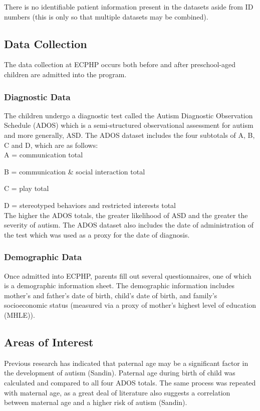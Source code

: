 \documentclass{article}
\begin{document}
There is no identifiable patient information present in the datasets aside from ID numbers (this is only so that multiple datasets may be combined).

\subsection{Data Collection}

The data collection at ECPHP occurs both before and after preschool-aged children are admitted into the program. 

\subsubsection{Diagnostic Data}

The children undergo a diagnostic test called the Autism Diagnostic Observation Schedule (ADOS) which is a semi-structured observational assessment for autism and more generally, ASD. The ADOS dataset includes the four subtotals of A, B, C and D, which are as follows:\\

    A = communication total
    
    B = communication \& social interaction total
    
    C = play total
    
    D = stereotyped behaviors and restricted interests total\\
    
The higher the ADOS totals, the greater likelihood of ASD and the greater the severity of autism. The ADOS dataset also includes the date of administration of the test which was used as a proxy for the date of diagnosis.

\subsubsection{Demographic Data}
Once admitted into ECPHP, parents fill out several questionnaires, one of which is a demographic information sheet. The demographic information includes mother's and father's date of birth, child's date of birth, and family's socioeconomic status (measured via a proxy of mother's highest level of education (MHLE)). 

\subsection{Areas of Interest}

Previous research has indicated that paternal age may be a significant factor in the development of autism (Sandin). Paternal age during birth of child was calculated and compared to all four ADOS totals. The same process was repeated with maternal age, as a great deal of literature also suggests a correlation between maternal age and a higher risk of autism (Sandin).
\end{document}
